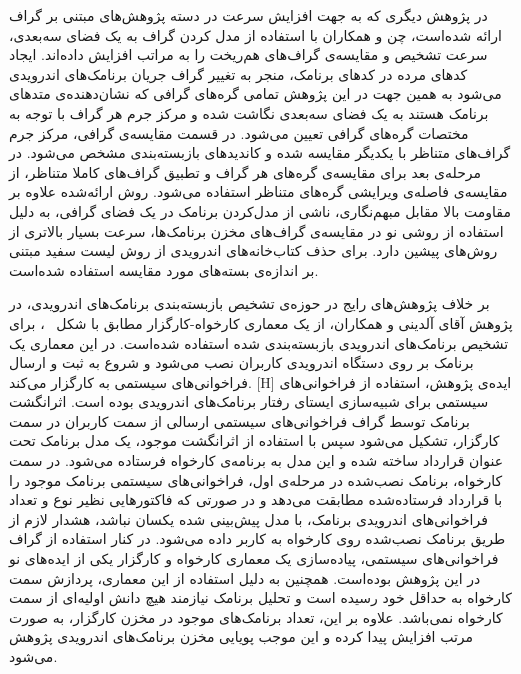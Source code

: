 در پژوهش دیگری که به جهت افزایش سرعت در دسته‌ پژوهش‌های مبتنی بر گراف ارائه شده‌است، چن و همکاران با استفاده از مدل کردن گراف به یک فضای سه‌بعدی، سرعت تشخیص و مقایسه‌ی گراف‌های هم‌ریخت را به مراتب افزایش داده‌اند. ایجاد کد‌های مرده‌ در کد‌های برنامک، منجر به تغییر گراف‌ جریان برنامک‌های اندرویدی می‌شود به همین جهت در این پژوهش تمامی گره‌های گرافی که نشان‌دهنده‌ی متد‌های برنامک هستند به یک فضای سه‌بعدی نگاشت شده و مرکز جرم هر گراف با توجه به مختصات گره‌های گرافی تعیین می‌شود. در قسمت مقایسه‌ی گرافی، مرکز جرم گراف‌‌های متناظر با یکدیگر مقایسه شده و کاندید‌های بازبسته‌بندی مشخص می‌شود. در مرحله‌ی بعد برای مقایسه‌ی گره‌های هر گراف و تطبیق گراف‌های کاملا متناظر، از مقایسه‌ی فاصله‌ی ویرایشی گره‌های متناظر استفاده می‌شود. روش ارائه‌شده علاوه بر مقاومت بالا مقابل مبهم‌نگاری، ناشی از مدل‌کردن برنامک در یک فضای گرافی، به دلیل استفاده از روشی نو در مقایسه‌ی گراف‌های مخزن برنامک‌ها، سرعت بسیار بالاتری از روش‌های پیشین دارد. برای حذف کتاب‌خانه‌های اندرویدی از روش لیست سفید مبتنی بر اندازه‌ی بسته‌های مورد مقایسه استفاده شده‌است.

بر خلاف پژوهش‌های رایج در حوزه‌ی تشخیص بازبسته‌بندی برنامک‌های اندرویدی، در پژوهش آقای آلدینی و همکاران، از یک معماری کارخواه-کارگزار‌ مطابق با شکل ~، برای تشخیص برنامک‌های اندرویدی بازبسته‌بندی شده استفاده شده‌است. در این معماری یک برنامک بر روی دستگاه اندرویدی کاربران نصب می‌شود و شروع به ثبت و ارسال فراخوانی‌های سیستمی به کارگزار می‌کند.
[H]
\vspace{1em}
ایده‌ی پژوهش، استفاده از فراخوانی‌های سیستمی برای شبیه‌سازی ایستا‌ی رفتار برنامک‌های اندرویدی بوده است. اثرانگشت برنامک توسط گراف فراخوانی‌های سیستمی ارسالی از سمت کاربران در سمت کارگزار، تشکیل می‌شود سپس با استفاده از اثرانگشت موجود، یک مدل برنامک تحت عنوان قرارداد ساخته شده و این مدل به برنامه‌ی کارخواه فرستاده می‌شود. در سمت کارخواه، برنامک نصب‌شده در مرحله‌ی اول، فراخوانی‌های سیستمی برنامک موجود را با قرارداد فرستاده‌شده مطابقت می‌دهد و در صورتی که فاکتور‌هایی نظیر نوع و تعداد فراخوانی‌های اندرویدی برنامک، با مدل پیش‌بینی شده یکسان نباشد، هشدار لازم از طریق برنامک نصب‌شده روی کارخواه به کاربر داده می‌شود. در کنار استفاده از گراف فراخوانی‌‌های سیستمی، پیاده‌سازی یک معماری کارخواه و کارگزار یکی از ایده‌های نو در این پژوهش بوده‌است. همچنین به دلیل استفاده از این معماری، پردازش سمت کارخواه به حداقل خود رسیده است و تحلیل برنامک نیازمند هیچ دانش اولیه‌ای از سمت کارخواه نمی‌باشد. علاوه بر این، تعداد برنامک‌های موجود در مخزن کارگزار، به صورت مرتب افزایش پیدا کرده و این موجب پویایی مخزن برنامک‌های اندرویدی پژوهش می‌شود. 

